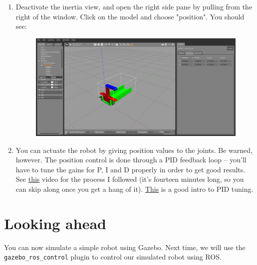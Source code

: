 \documentclass{article}
\begin{document}
\begin{enumerate}
            \item Deactivate the inertia view, and open the right side pane by pulling from the right 
            of the window. Click on the model and choose "position". You should see:
            \begin{figure}[H]
                \center
                \includegraphics[width = \textwidth]{image_5.png}
            \end{figure}
            \item You can actuate the robot by giving position values to the joints. Be warned, however. The 
            position control is done through a PID feedback loop -- you'll have to tune the gains for P, I and D properly 
            in order to get good results. See \href{https://www.youtube.com/watch?v=HqrHktN-6TI}{this} video for the process I followed (it's fourteen minutes long, so you can skip along once you
            get a hang of it). \href{https://towardsdatascience.com/pid-controller-intro-26fda41aaa59}{This} is a good intro to PID tuning.
        \end{enumerate}
            
    \section{Looking ahead}
    You can now simulate a simple robot using Gazebo. Next time, we will use the \texttt{gazebo\_ros\_control} plugin to 
    control our simulated robot using ROS.
\end{document}
